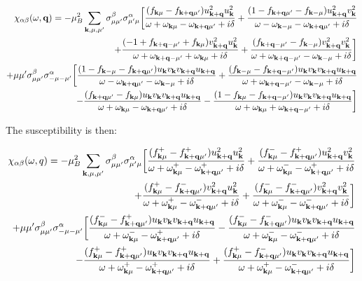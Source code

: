 \documentclass[prb,showpacs,amssymb,amsmath,twocolumn]{revtex4-1}
\begin{document}
\begin{widetext}
\begin{align*}
\chi_{\alpha\beta}(\omega,{\bf q}) = -\mu_B^2 \sum\limits_{{\bf k},\mu,\mu'} \sigma^\beta_{\mu\mu'}\sigma^\alpha_{\mu'\mu}\bigg[\frac{(f_{{\bf k}\mu}-f_{{\bf k}+{\bf q}\mu'})u_{{\bf k}+{\bf q}}^2u_{\bf k}^2} {\omega+ \omega_{{\bf k}\mu}-\omega_{{\bf k}+{\bf q}\mu'}+i\delta}
+\frac{(1-f_{{\bf k}+{\bf q}\mu'}-f_{{\bf k}-\mu})u_{{\bf k}+{\bf q}}^2v_{\bf k}^2} {\omega-\omega_{{\bf k}-\mu}-\omega_{{\bf k}+{\bf q}\mu'}+i\delta}\\
+\frac{(-1+f_{{\bf k}+{\bf q}-\mu'}+f_{{\bf k}\mu})v_{{\bf k}+{\bf q}}^2u_{\bf k}^2} {\omega+\omega_{{\bf k}+{\bf q}-\mu'}+\omega_{{\bf k}\mu}+i\delta}
+\frac{(f_{{\bf k}+{\bf q}-\mu'}-f_{{\bf k}-\mu})v_{{\bf k}+{\bf q}}^2v_{\bf k}^2} {\omega+\omega_{{\bf k}+{\bf q}-\mu'}-\omega_{{\bf k}-\mu}+i\delta}\bigg] 
\\
+\mu\mu' \sigma^\beta_{\mu\mu'}\sigma^\alpha_{-\mu-\mu'}\bigg[\frac{(1-f_{{\bf k}-\mu}-f_{{\bf k}+{\bf q}\mu'})u_{\bf k} v_{\bf k} v_{{\bf k}+{\bf q}}u_{{\bf k}+{\bf q}}} {\omega-\omega_{{\bf k}+{\bf q}\mu'} - \omega_{{\bf k}-\mu}+i\delta}
+\frac{(f_{{\bf k}-\mu}-f_{{\bf k}+{\bf q}-\mu'})u_{\bf k} v_{\bf k} v_{{\bf k}+{\bf q}}u_{{\bf k}+{\bf q}}} {\omega+\omega_{{\bf k}+{\bf q}-\mu'}-\omega_{{\bf k}-\mu}+i\delta} \\
-\frac{(f_{{\bf k}+{\bf q}\mu'}-f_{{\bf k}\mu})u_{\bf k} v_{\bf k} v_{{\bf k}+{\bf q}}u_{{\bf k}+{\bf q}}} {\omega+\omega_{{\bf k}\mu}-\omega_{{\bf k}+{\bf q}\mu'}+i\delta}
-\frac{(1-f_{{\bf k}\mu}-f_{{\bf k}+{\bf q}-\mu'})u_{\bf k} v_{\bf k} v_{{\bf k}+{\bf q}}u_{{\bf k}+{\bf q}}} {\omega+\omega_{{\bf k}\mu}+\omega_{{\bf k}+{\bf q}-\mu'}+i\delta}\bigg]
\end{align*}

The susceptibility is then:

\begin{align*}
\chi_{\alpha\beta}(\omega,q) =- \mu_B^2 \sum\limits_{{\bf k},\mu,\mu'} \sigma^\beta_{\mu\mu'}\sigma^\alpha_{\mu'\mu} \bigg[\frac{(f^+_{{\bf k}\mu}-f^+_{{\bf k}+{\bf q}\mu'})u_{{\bf k}+{\bf q}}^2u_{\bf k}^2} {\omega+\omega^+_{{\bf k}\mu}- \omega^+_{{\bf k}+{\bf q}\mu'}+i\delta}
+\frac{(f^-_{{\bf k}\mu}-f^+_{{\bf k}+{\bf q}\mu'})u_{{\bf k}+{\bf q}}^2v_{\bf k}^2} {\omega+\omega^-_{{\bf k}\mu}-\omega^+_{{\bf k}+{\bf q}\mu'}+i\delta}\\
+\frac{(f^+_{{\bf k}\mu}-f^-_{{\bf k}+{\bf q}\mu'})v_{{\bf k}+{\bf q}}^2u_{\bf k}^2} {\omega+\omega^+_{{\bf k}\mu}-\omega^-_{{\bf k}+{\bf q}\mu'}+i\delta}
+\frac{(f^-_{{\bf k}\mu}-f^-_{{\bf k}+{\bf q}\mu'})v_{{\bf k}+{\bf q}}^2v_{\bf k}^2} {\omega+\omega^-_{{\bf k}\mu}-\omega^-_{{\bf k}+{\bf q}\mu'}+i\delta}\bigg] 
\\
+\mu\mu' \sigma^\beta_{\mu\mu'}\sigma^\alpha_{-\mu-\mu'}\bigg[\frac{(f^-_{{\bf k}\mu}-f^+_{{\bf k}+{\bf q}\mu'})u_{\bf k} v_{\bf k} v_{{\bf k}+{\bf q}}u_{{\bf k}+{\bf q}}} {\omega+ \omega^-_{{\bf k}\mu}-\omega^+_{{\bf k}+{\bf q}\mu'} +i\delta}
-\frac{(f^-_{{\bf k}\mu}-f^-_{{\bf k}+{\bf q}\mu'})u_{\bf k} v_{\bf k} v_{{\bf k}+{\bf q}}u_{{\bf k}+{\bf q}}} {\omega+\omega^-_{{\bf k}\mu}-\omega^-_{{\bf k}+{\bf q}\mu'}+i\delta} \\
-\frac{(f^+_{{\bf k}\mu}-f^+_{{\bf k}+{\bf q}\mu'})u_{\bf k} v_{\bf k} v_{{\bf k}+{\bf q}}u_{{\bf k}+{\bf q}}} {\omega+\omega^+_{{\bf k}\mu}-\omega^+_{{\bf k}+{\bf q}\mu'}+i\delta}
+\frac{(f^+_{{\bf k}\mu}-f^-_{{\bf k}+{\bf q}\mu'})u_{\bf k} v_{\bf k} v_{{\bf k}+{\bf q}}u_{{\bf k}+{\bf q}}} {\omega+\omega^+_{{\bf k}\mu}-\omega^-_{{\bf k}+{\bf q}\mu'}+i\delta}\bigg]
\end{align*}


\end{widetext}
\end{document}
